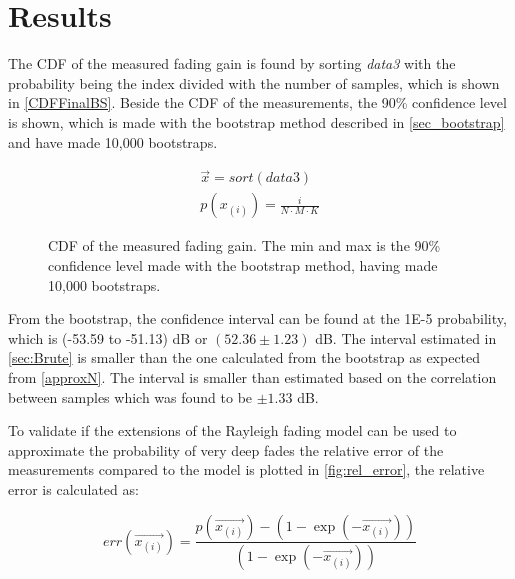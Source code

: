 \section{Results}

The \gls{CDF} of the measured fading gain is found by sorting \textit{data3} with the probability being the index divided with the number of samples, which is shown in \autoref{CDFFinalBS}. Beside the CDF of the measurements, the 90\% confidence level is shown, which is made with the bootstrap method described in \autoref{sec_bootstrap} and have made 10,000 bootstraps. 

\begin{align}
\overrightarrow{x} = sort(data3)\\
p(x_{(i)}) = \frac{i}{N\cdot M\cdot K} 
\end{align} 
\begin{where}
\end{where}

\begin{figure}[H]
\centering

\caption{CDF of the measured fading gain. The min and max is the 90\% confidence level made with the bootstrap method, having made 10,000 bootstraps.}
\label{CDFFinalBS}
\end{figure}

From the bootstrap, the confidence interval can be found at the 1E-5 probability, which is (-53.59 to -51.13) dB or $(52.36\pm 1.23)$ dB. The interval estimated in \autoref{sec:Brute} is smaller than the one calculated from the bootstrap as expected from \autoref{approxN}. The interval is smaller than estimated based on the correlation between samples which was found to be $\pm 1.33$ dB.


To validate if the extensions of the Rayleigh fading model can be used to approximate the probability of very deep fades the relative error of the measurements compared to the model is plotted in \autoref{fig:rel_error}, the relative error is calculated as:

\begin{equation}
err(\overrightarrow{x_{(i)}}) = \frac{p(\overrightarrow{x_{(i)}})-\left(1-\exp(-\overrightarrow{x_{(i)}})\right)}{(1-\exp(-\overrightarrow{x_{(i)}}))}
\end{equation}
\begin{where}
\end{where}


